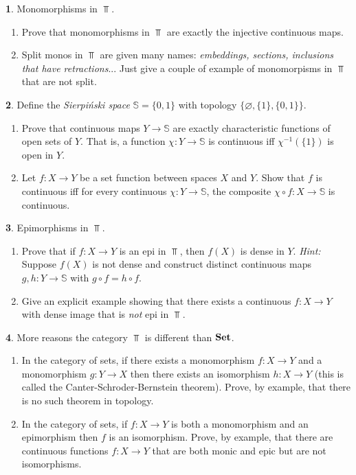 \documentclass[11pt]{article}
\theoremstyle{definition}
\newtheorem{problem}{}
\newcommand{\bp}{\begin{problem}}
\newcommand{\ep}{\end{problem}\bigskip}
\theoremstyle{theorem}
\begin{document}
\begin{problem} Monomorphisms in $\Top$.
\begin{enumerate}[label=(\alph*)]
\item Prove that monomorphisms in $\Top$ are exactly the injective continuous maps.
\item Split monos in $\Top$ are given many names:  \emph{embeddings, sections, inclusions that have retractions}...  Just give a couple of example  of monomorpisms in $\Top$ that are not split.
\end{enumerate}
\end{problem}

\bp Define the \emph{Sierpiński space} $\mathbb S=\{0,1\}$ with topology $\{\varnothing,\{1\},\{0,1\}\}$.  
\begin{enumerate}[label=(\alph*)]
\item Prove that continuous maps $Y\to\mathbb S$ are exactly characteristic functions of open sets of $Y$.  That is, a function $\chi:Y\to\mathbb S$ is continuous iff $\chi^{-1}(\{1\})$ is open in $Y$.
\item Let $f:X\to Y$ be a set function between spaces $X$ and $Y$. Show that $f$ is continuous iff for every continuous $\chi:Y\to\mathbb S$, the composite $\chi\circ f:X\to\mathbb S$ is continuous. 
\end{enumerate}
\ep 

\pagebreak

\begin{problem} Epimorphisms in $\Top$.
\begin{enumerate}[label=(\alph*)]
\item Prove that if $f:X\to Y$ is an epi in $\Top$, then $f(X)$ is dense in $Y$. \emph{Hint:} Suppose $f(X)$ is not dense and construct distinct continuous maps $g,h:Y\to\mathbb S$ with $g\circ f=h\circ f$.
\item Give an explicit example showing that there exists a continuous $f:X\to Y$ with dense image that is \emph{not} epi in $\Top$. 
\end{enumerate}
\end{problem}

\begin{problem}More reasons the category $\Top$ is different than $\mathbf{Set}$.
\begin{enumerate}[label=(\alph*)]
\item In the category of sets, if there exists a monomorphism $f:X \to Y$ and a monomorphism $g:Y \to X$ then there exists an isomorphism $h:X \to Y$ (this is called the Canter-Schroder-Bernstein theorem).  Prove, by example, that there is no such theorem in topology.
\item In the category of sets, if $f:X \to Y$ is both a monomorphism and an epimorphism then $f$ is an isomorphism.  Prove, by example, that there are continuous functions $f:X\to Y$ that are both monic and epic but are not isomorphisms.
\end{enumerate}
\end{problem}
\end{document}
